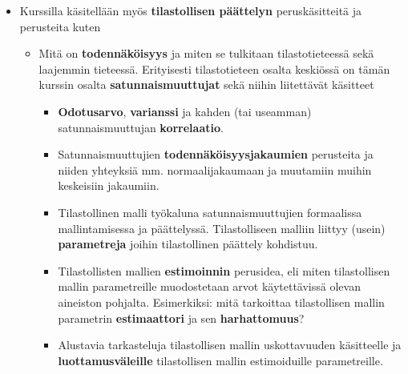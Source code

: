 \documentclass[
]{book}
\providecommand{\tightlist}{%
  \setlength{\itemsep}{0pt}\setlength{\parskip}{0pt}}
\begin{document}
\begin{itemize}
\tightlist
\item
  Kurssilla käsitellään myös \textbf{tilastollisen päättelyn} peruskäsitteitä ja perusteita kuten

  \begin{itemize}
  \tightlist
  \item
    Mitä on \textbf{todennäköisyys} ja miten se tulkitaan tilastotieteessä sekä laajemmin tieteessä. Erityisesti tilastotieteen osalta keskiössä on tämän kurssin osalta \textbf{satunnaismuuttujat} sekä niihin liitettävät käsitteet

    \begin{itemize}
    \tightlist
    \item
      \textbf{Odotusarvo}, \textbf{varianssi} ja kahden (tai useamman) satunnaismuuttujan \textbf{korrelaatio}.
    \item
      Satunnaismuuttujien \textbf{todennäköisyysjakaumien} perusteita ja niiden yhteyksiä mm. normaalijakaumaan ja muutamiin muihin keskeisiin jakaumiin.
    \item
      Tilastollinen malli työkaluna satunnaismuuttujien formaalissa mallintamisessa ja päättelyssä. Tilastolliseen malliin liittyy (usein) \textbf{parametreja} joihin tilastollinen päättely kohdistuu.
    \item
      Tilastollisten mallien \textbf{estimoinnin} perusidea, eli miten tilastollisen mallin parametreille muodostetaan arvot käytettävissä olevan aineiston pohjalta. Esimerkiksi: mitä tarkoittaa tilastollisen mallin parametrin \textbf{estimaattori} ja sen \textbf{harhattomuus}?
    \item
      Alustavia tarkasteluja tilastollisen mallin uskottavuuden käsitteelle ja \textbf{luottamusväleille} tilastollisen mallin estimoiduille parametreille.
    \end{itemize}
  \end{itemize}
\end{itemize}

\vspace{0.75cm}
\end{document}
